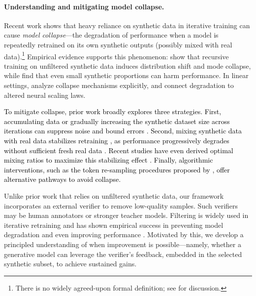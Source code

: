 \paragraph{Understanding and mitigating model collapse.}
Recent work shows that heavy reliance on synthetic data in iterative training can cause \emph{model collapse}—the degradation of performance when a model is repeatedly retrained on its own synthetic outputs (possibly mixed with real data).\footnote{There is no widely agreed-upon formal definition; see \citep{schaeffer2025position} for discussion.} Empirical evidence supports this phenomenon: \citet{shumailov2024ai} show that recursive training on unfiltered synthetic data induces distribution shift and mode collapse, while \citet{dohmatobstrong} find that even small synthetic proportions can harm performance. In linear settings, \citet{dohmatob2024model} analyze collapse mechanisms explicitly, and \citet{dohmatob2024tale} connect degradation to altered neural scaling laws.




\textcolor{black}{To mitigate collapse, prior work broadly explores three strategies.
First, accumulating data or gradually increasing the synthetic dataset size across iterations can suppress noise and bound errors \citep{gerstgrasser2024model, dey2024universality, xu2025probabilistic, kazdancollapse, barzilai2025models}.
Second, mixing synthetic data with real data stabilizes retraining \citep{bertrand2024stability, fu2024towards, futheoretical}, as performance progressively degrades without sufficient fresh real data \citep{alemohammad2023self}.
Recent studies have even derived optimal mixing ratios to maximize this stabilizing effect \citep{he2025golden, garg2025preventing}.
Finally, algorithmic interventions, such as the token re-sampling procedures proposed by \citet{zhusynthesize}, offer alternative pathways to avoid collapse.}

     

Unlike prior work that relies on unfiltered synthetic data, our framework incorporates an external verifier to remove low-quality samples. Such verifiers may be human annotators or stronger teacher models. Filtering is widely used in iterative retraining and has shown empirical success in preventing model degradation and even improving performance \citep{hesynthetic,tian2023stablerep,guo2024deepseek,zelikman2022star,zhang2024regurgitative, lampis2023bridging, haluptzoklanguage, patwa2024enhancing}. Motivated by this, we develop a principled understanding of when improvement is possible—namely, whether a generative model can leverage the verifier’s feedback, embedded in the selected synthetic subset, to achieve sustained gains.


